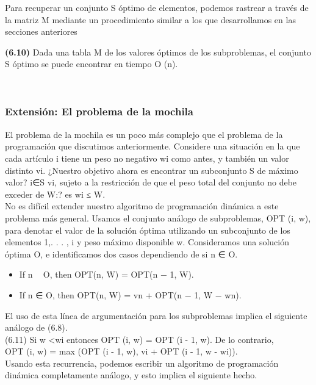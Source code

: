 \documentclass[a4paper]{article}
\begin{document}
Para recuperar un conjunto S óptimo de elementos, podemos rastrear a través de la matriz M mediante un procedimiento similar a los que desarrollamos en las secciones anteriores\\

\colorbox{mygray}{\parbox{15cm}{
\textbf{(6.10)} Dada una tabla M de los valores óptimos de los subproblemas, el conjunto S óptimo se puede encontrar en tiempo O (n).}}\\

\subsubsection*{Extensión: El problema de la mochila}

El problema de la mochila es un poco más complejo que el problema de la programación que discutimos anteriormente. Considere una situación en la que cada artículo i tiene un peso no negativo wi como antes, y también un valor distinto vi. ¿Nuestro objetivo ahora es encontrar un subconjunto S de máximo valor? i∈S vi, sujeto a la restricción de que el peso total del conjunto no debe exceder de W:? es wi ≤ W.\\

No es difícil extender nuestro algoritmo de programación dinámica a este problema más general. Usamos el conjunto análogo de subproblemas, OPT (i, w), para denotar el valor de la solución óptima utilizando un subconjunto de los elementos {1,. . . , i} y peso máximo disponible w. Consideramos una solución óptima O, e identificamos dos casos dependiendo de si n ∈ O.\\

\begin{itemize}
    \item If n ∈ O, then OPT(n, W) = OPT(n − 1, W).
    \item If n ∈ O, then OPT(n, W) = vn + OPT(n − 1, W − wn).
\end{itemize}

El uso de esta línea de argumentación para los subproblemas implica el siguiente análogo de (6.8).\\

(6.11) Si w <wi entonces OPT (i, w) = OPT (i - 1, w). De lo contrario,\\
OPT (i, w) = max (OPT (i - 1, w), vi + OPT (i - 1, w - wi)).\\

Usando esta recurrencia, podemos escribir un algoritmo de programación dinámica completamente análogo, y esto implica el siguiente hecho.\\
\end{document}
